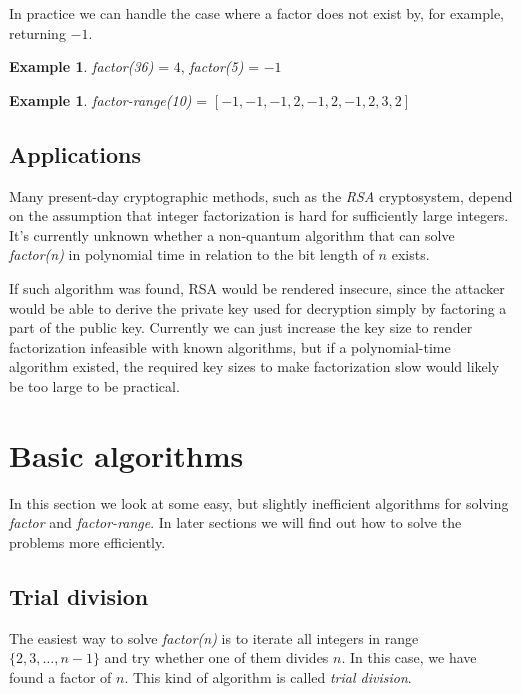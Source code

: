 \documentclass[12pt] {article}
\theoremstyle{plain}
\theoremstyle{definition}
\newtheorem{exmp}[thm]{Example}
\begin{document}
In practice we can handle the case where a factor does not exist by, for example, returning $-1$.

\begin{exmp}
\textit{factor(36)} = $4$, \textit{factor(5)} = $-1$
\end{exmp}

\begin{exmp}
\textit{factor-range(10)} = $[-1, -1, -1, 2, -1, 2, -1, 2, 3, 2]$
\end{exmp}

\subsection {Applications}

Many present-day cryptographic methods, such as the \textit{RSA} cryptosystem, depend on the assumption that integer factorization is hard for sufficiently large integers. It's currently unknown whether a non-quantum algorithm that can solve \textit{factor(n)} in polynomial time in relation to the bit length of $n$ exists\cite{stein}.

If such algorithm was found, RSA would be rendered insecure, since the attacker would be able to derive the private key used for decryption simply by factoring a part of the public key. Currently we can just increase the key size to render factorization infeasible with known algorithms, but if a polynomial-time algorithm existed, the required key sizes to make factorization slow would likely be too large to be practical.

\section {Basic algorithms}

In this section we look at some easy, but slightly inefficient algorithms for solving \textit{factor} and \textit{factor-range}. In later sections we will find out how to solve the problems more efficiently.

\subsection {Trial division}

The easiest way to solve \textit{factor(n)} is to iterate all integers in range $\{2, 3, \dots, n-1\}$ and try whether one of them divides $n$. In this case, we have found a factor of $n$. This kind of algorithm is called \textit{trial division}. 
\end{document}
